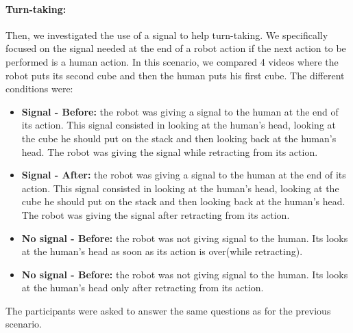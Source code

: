 \documentclass[english,a4paper,11pt,twoside]{StyleThese}
\begin{document}
\paragraph{Turn-taking:} Then, we investigated the use of a signal to help turn-taking. We specifically focused on the signal needed at the end of a robot action if the next action to be performed is a human action. In this scenario, we compared 4 videos where the robot puts its second cube and then the human puts his first cube. The different conditions were:
\begin{itemize}
\item \textbf{Signal - Before:} the robot was giving a signal to the human at the end of its action. This signal consisted in looking at the human's head, looking at the cube he should put on the stack and then looking back at the human's head. The robot was giving the signal while retracting from its action.
\item \textbf{Signal - After:} the robot was giving a signal to the human at the end of its action. This signal consisted in looking at the human's head, looking at the cube he should put on the stack and then looking back at the human's head. The robot was giving the signal after retracting from its action.
\item \textbf{No signal - Before:} the robot was not giving signal to the human. Its looks at the human's head as soon as its action is over(while retracting).
\item \textbf{No signal - Before:} the robot was not giving signal to the human. Its looks at the human's head only after retracting from its action.
\end{itemize}
The participants were asked to answer the same questions as for the previous scenario.
\end{document}

